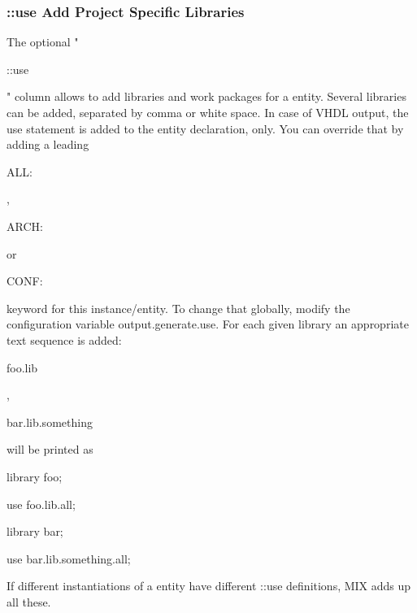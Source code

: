 \documentclass[a4paper,12pt]{article}
\begin{document}
\subsubsection{::use Add Project Specific Libraries}
The optional "\begin{tt}::use\end{tt}" column allows to add libraries and work packages for a entity. Several libraries can be added, separated by comma or white space. In case of VHDL output, the use statement is added to the entity declaration, only. You can override that by adding a leading \begin{tt}ALL:\end{tt}, \begin{tt}ARCH:\end{tt} or \begin{tt}CONF:\end{tt} keyword for this instance/entity. To change that globally, modify the configuration variable output.generate.use.\newline
For each given library an appropriate text sequence is added:\newline
\hspace*{20mm}\begin{tt}foo.lib\end{tt}, \begin{tt}bar.lib.something\end{tt}\newline
will be printed as\newline
\hspace*{20mm}\begin{tt}library foo;\end{tt}\newline
\hspace*{20mm}\begin{tt}use foo.lib.all;\end{tt}\newline
\hspace*{20mm}\begin{tt}library bar;\end{tt}\newline
\hspace*{20mm}\begin{tt}use bar.lib.something.all;\end{tt}\newline
If different instantiations of a entity have different ::use\newline
definitions, MIX adds up all these.\newline
\end{document}
